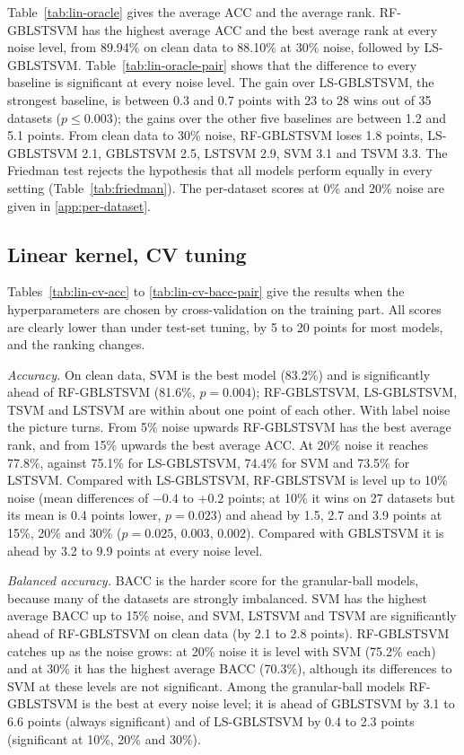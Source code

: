 \documentclass[preprint,12pt]{elsarticle}
\newcommand{\RF}{RF-GBLSTSVM}
\begin{document}
Table~\ref{tab:lin-oracle} gives the average ACC and the average rank. \RF{} has the highest average ACC and the best average rank at every noise level, from 89.94\% on clean data to 88.10\% at 30\% noise, followed by LS-GBLSTSVM. Table~\ref{tab:lin-oracle-pair} shows that the difference to every baseline is significant at every noise level. The gain over LS-GBLSTSVM, the strongest baseline, is between 0.3 and 0.7 points with 23 to 28 wins out of 35 datasets ($p\le 0.003$); the gains over the other five baselines are between 1.2 and 5.1 points. From clean data to 30\% noise, \RF{} loses 1.8 points, LS-GBLSTSVM 2.1, GBLSTSVM 2.5, LSTSVM 2.9, SVM 3.1 and TSVM 3.3. The Friedman test rejects the hypothesis that all models perform equally in every setting (Table~\ref{tab:friedman}). The per-dataset scores at 0\% and 20\% noise are given in \ref{app:per-dataset}.




\subsection{Linear kernel, CV tuning}

Tables~\ref{tab:lin-cv-acc} to \ref{tab:lin-cv-bacc-pair} give the results when the hyperparameters are chosen by cross-validation on the training part. All scores are clearly lower than under test-set tuning, by 5 to 20 points for most models, and the ranking changes.

\emph{Accuracy.} On clean data, SVM is the best model (83.2\%) and is significantly ahead of \RF{} (81.6\%, $p=0.004$); \RF{}, LS-GBLSTSVM, TSVM and LSTSVM are within about one point of each other. With label noise the picture turns. From 5\% noise upwards \RF{} has the best average rank, and from 15\% upwards the best average ACC. At 20\% noise it reaches 77.8\%, against 75.1\% for LS-GBLSTSVM, 74.4\% for SVM and 73.5\% for LSTSVM. Compared with LS-GBLSTSVM, \RF{} is level up to 10\% noise (mean differences of $-0.4$ to $+0.2$ points; at 10\% it wins on 27 datasets but its mean is 0.4 points lower, $p=0.023$) and ahead by 1.5, 2.7 and 3.9 points at 15\%, 20\% and 30\% ($p=0.025$, $0.003$, $0.002$). Compared with GBLSTSVM it is ahead by 3.2 to 9.9 points at every noise level.

\emph{Balanced accuracy.} BACC is the harder score for the granular-ball models, because many of the datasets are strongly imbalanced. SVM has the highest average BACC up to 15\% noise, and SVM, LSTSVM and TSVM are significantly ahead of \RF{} on clean data (by 2.1 to 2.8 points). \RF{} catches up as the noise grows: at 20\% noise it is level with SVM (75.2\% each) and at 30\% it has the highest average BACC (70.3\%), although its differences to SVM at these levels are not significant. Among the granular-ball models \RF{} is the best at every noise level; it is ahead of GBLSTSVM by 3.1 to 6.6 points (always significant) and of LS-GBLSTSVM by 0.4 to 2.3 points (significant at 10\%, 20\% and 30\%).
\end{document}
